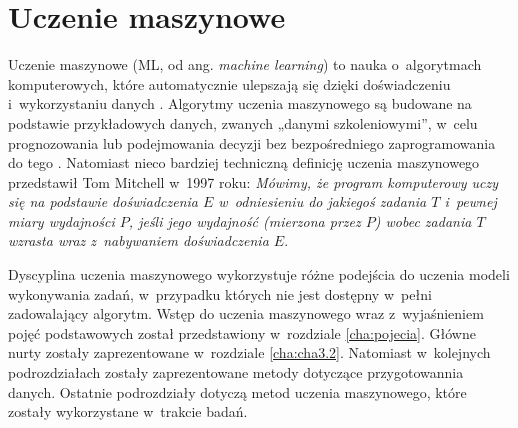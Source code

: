 %		
%
%
%
%

\chapter{Uczenie maszynowe}
\label{cha:ucz.masz}

Uczenie maszynowe (ML, od ang. \textit{machine learning}) to nauka o~algorytmach komputerowych, które automatycznie ulepszają się dzięki doświadczeniu i~wykorzystaniu danych \cite{Mitchell97}. Algorytmy uczenia maszynowego są budowane na podstawie przykładowych danych, zwanych „danymi szkoleniowymi”, w~celu prognozowania lub podejmowania decyzji bez bezpośredniego zaprogramowania do tego \cite{Koza96}. Natomiast nieco bardziej techniczną definicję uczenia maszynowego przedstawił Tom Mitchell w~1997 roku: \textit{Mówimy, że program komputerowy uczy się na podstawie doświadczenia $E$ w~odniesieniu do jakiegoś zadania $T$ i~pewnej miary wydajności $P$, jeśli jego wydajność (mierzona przez $P$) wobec zadania $T$ wzrasta wraz z~nabywaniem doświadczenia $E$}.

Dyscyplina uczenia maszynowego wykorzystuje różne podejścia do uczenia modeli wykonywania zadań, w~przypadku których nie jest dostępny w~pełni zadowalający algorytm. Wstęp do uczenia maszynowego wraz z~wyjaśnieniem pojęć podstawowych został przedstawiony w~rozdziale \ref{cha:pojecia}. Główne nurty zostały zaprezentowane w~rozdziale \ref{cha:cha3.2}. Natomiast w~kolejnych podrozdziałach zostały zaprezentowane metody dotyczące przygotowannia danych. Ostatnie podrozdziały dotyczą metod  uczenia maszynowego, które zostały wykorzystane w~trakcie badań.

